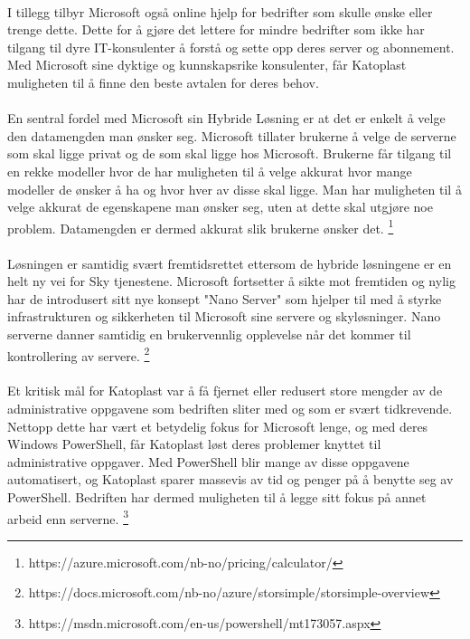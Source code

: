 \paragraph{} I tillegg tilbyr Microsoft også online hjelp for bedrifter som skulle ønske eller trenge dette. Dette for å gjøre det lettere for mindre bedrifter som ikke har tilgang til dyre IT-konsulenter å forstå og sette opp deres server og abonnement. Med Microsoft sine dyktige og kunnskapsrike konsulenter, får Katoplast muligheten til å finne den beste avtalen for deres behov. 

\paragraph{} En sentral fordel med Microsoft sin Hybride Løsning er at det er enkelt å velge den datamengden man ønsker seg. Microsoft tillater brukerne å velge de serverne som skal ligge privat og de som skal ligge hos Microsoft. Brukerne får tilgang til en rekke modeller hvor de har muligheten til å velge akkurat hvor mange modeller de ønsker å ha og hvor hver av disse skal ligge. Man har muligheten til å velge akkurat de egenskapene man ønsker seg, uten at dette skal utgjøre noe problem. Datamengden er dermed akkurat slik brukerne ønsker det. 
\footnote{https://azure.microsoft.com/nb-no/pricing/calculator/}

\paragraph{} Løsningen er samtidig svært fremtidsrettet ettersom de hybride løsningene er en helt ny vei for Sky tjenestene. Microsoft fortsetter å sikte mot fremtiden og nylig har de introdusert sitt nye konsept "Nano Server" som hjelper til med å styrke infrastrukturen og sikkerheten til Microsoft sine servere og skyløsninger. Nano serverne danner samtidig en brukervennlig opplevelse når det kommer til kontrollering av servere.
\footnote{https://docs.microsoft.com/nb-no/azure/storsimple/storsimple-overview}

\paragraph{} Et kritisk mål for Katoplast var å få fjernet eller redusert store mengder av de administrative oppgavene som bedriften sliter med og som er svært tidkrevende. Nettopp dette har vært et betydelig fokus for Microsoft lenge, og med deres Windows PowerShell, får Katoplast løst deres problemer knyttet til administrative oppgaver. Med PowerShell blir mange av disse oppgavene automatisert, og Katoplast sparer massevis av tid og penger på å benytte seg av PowerShell. Bedriften har dermed muligheten til å legge sitt fokus på annet arbeid enn serverne.
\footnote{https://msdn.microsoft.com/en-us/powershell/mt173057.aspx}

